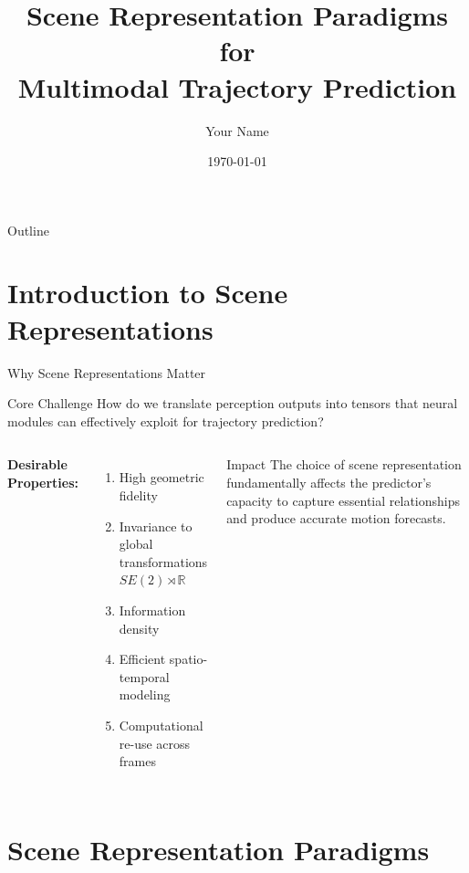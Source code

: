 \documentclass[10pt,aspectratio=169]{beamer}
\title{Scene Representation Paradigms for \\ Multimodal Trajectory Prediction}
\author{Your Name}
\institute{Computer Science Department}
\date{\today}
\begin{document}
\frame{\titlepage}

\begin{frame}{Outline}
\tableofcontents
\end{frame}

\section{Introduction to Scene Representations}

\begin{frame}{Why Scene Representations Matter}
\begin{block}{Core Challenge}
How do we translate perception outputs into tensors that neural modules can effectively exploit for trajectory prediction?
\end{block}

\vspace{0.5cm}

\begin{columns}[T]
\textbf{Desirable Properties:}
\begin{enumerate}
    \item High geometric fidelity
    \item Invariance to global transformations $SE(2) \rtimes \mathbb{R}$
    \item Information density
    \item Efficient spatio-temporal modeling
    \item Computational re-use across frames
\end{enumerate}

\begin{alertblock}{Impact}
The choice of scene representation fundamentally affects the predictor's capacity to capture essential relationships and produce accurate motion forecasts.
\end{alertblock}
\end{columns}
\end{frame}

\section{Scene Representation Paradigms}
\end{document}
